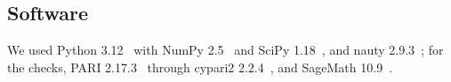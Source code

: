 \subsection*{Software}
We used Python 3.12~\cite{Python} with NumPy 2.5~\cite{HMvdW+20} and SciPy 1.18~\cite{VGO+20},
and nauty 2.9.3~\cite{McKP14}; for the checks, PARI 2.17.3~\cite{PARI} through
cypari2 2.2.4~\cite{cypari2}, and SageMath 10.9~\cite{Sage}.
